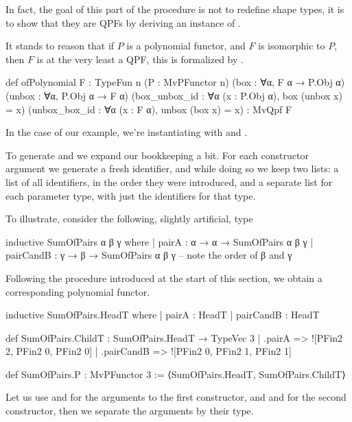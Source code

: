 In fact, the goal of this part of the procedure is not to redefine shape types, it is to show that
they are QPFs by deriving an instance of .

It stands to reason that if $P$ is a polynomial functor, and $F$ is isomorphic to $P$, then $F$ is at
the very least a QPF, this is formalized by .

\begin{leancode}
    def ofPolynomial {F : TypeFun n} 
                     (P : MvPFunctor n) 
                     (box    : ∀{α}, F α → P.Obj α) 
                     (unbox  : ∀{α}, P.Obj α → F α) 
                     (box_unbox_id : ∀{α} (x : P.Obj α), box (unbox x) = x)
                     (unbox_box_id : ∀{α} (x : F α), unbox (box x) = x)
                  : MvQpf F
\end{leancode}

In the case of our  example, we're instantiating  with 
 and .

To generate  and  we expand our bookkeeping a bit. For each constructor argument
we generate a fresh identifier, and while doing so we keep two lists: a list of all identifiers, in the
order they were introduced, and a separate list for each parameter type, with just the identifiers for that type.

To illustrate, consider the following, slightly artificial, type
\begin{leancode}
  inductive SumOfPairs α β γ where
    | pairA     : α → α → SumOfPairs α β γ 
    | pairCandB : γ → β → SumOfPairs α β γ   -- note the order of β and γ
\end{leancode}

Following the procedure introduced at the start of this section, we obtain a corresponding polynomial functor.
\begin{leancode}
  inductive SumOfPairs.HeadT where
    | pairA     : HeadT
    | pairCandB : HeadT

  def SumOfPairs.ChildT : SumOfPairs.HeadT → TypeVec 3
    | .pairA      => ![PFin2 2, PFin2 0, PFin2 0]
    | .pairCandB  => ![PFin2 0, PFin2 1, PFin2 1]

  def SumOfPairs.P : MvPFunctor 3 :=
    ⟨SumOfPairs.HeadT, SumOfPairs.ChildT⟩
\end{leancode}

Let us use  and  for the arguments to the first constructor, and  and 
for the second constructor, then we separate the arguments by their type.

